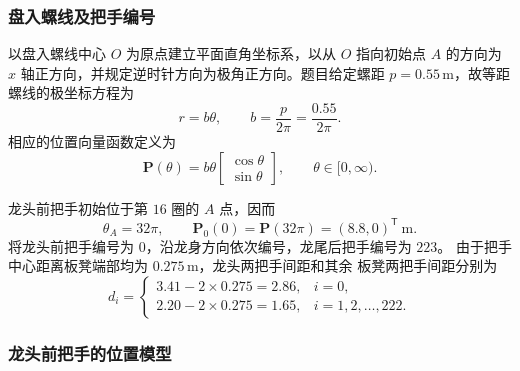 \documentclass[UTF8,fontset=windows,a4paper,12pt]{ctexart}
\begin{document}
\subsubsection{盘入螺线及把手编号}

以盘入螺线中心 $O$ 为原点建立平面直角坐标系，以从 $O$ 指向初始点
$A$ 的方向为 $x$ 轴正方向，并规定逆时针方向为极角正方向。题目给定螺距
$p=0.55\,\mathrm{m}$，故等距螺线的极坐标方程为
\begin{equation}
  r=b\theta,\qquad b=\frac{p}{2\pi}=\frac{0.55}{2\pi}.
  \label{eq:q1-spiral}
\end{equation}
相应的位置向量函数定义为
\begin{equation}
  \bm P(\theta)
  =b\theta
  \begin{bmatrix}
    \cos\theta\\
    \sin\theta
  \end{bmatrix},
  \qquad \theta\in[0,\infty).
  \label{eq:q1-coordinate}
\end{equation}

龙头前把手初始位于第 $16$ 圈的 $A$ 点，因而
\begin{equation}
  \theta_A=32\pi,\qquad
  \bm P_0(0)=\bm P(32\pi)=(8.8,0)^\mathsf{T}\ \mathrm{m}.
  \label{eq:q1-initial}
\end{equation}
将龙头前把手编号为 $0$，沿龙身方向依次编号，龙尾后把手编号为 $223$。
由于把手中心距离板凳端部均为 $0.275\,\mathrm{m}$，龙头两把手间距和其余
板凳两把手间距分别为
\begin{equation}
  d_i=
  \begin{cases}
    3.41-2\times0.275=2.86, & i=0,\\
    2.20-2\times0.275=1.65, & i=1,2,\ldots,222.
  \end{cases}
  \label{eq:q1-segment-length}
\end{equation}

\subsubsection{龙头前把手的位置模型}
\end{document}
